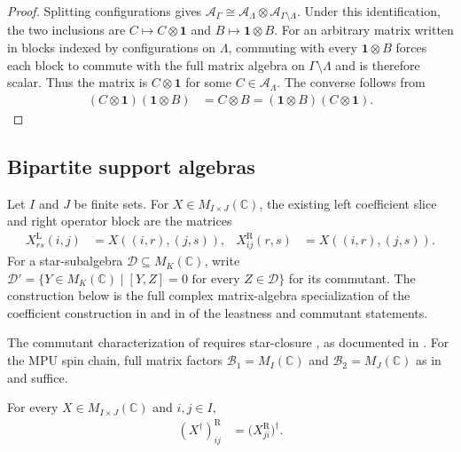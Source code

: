 \begin{proof}\leanok
    Splitting configurations gives
    $\mathcal A_\Gamma\cong
        \mathcal A_\Lambda\otimes\mathcal A_{\Gamma\setminus\Lambda}$. Under this
    identification, the two inclusions are $C\mapsto C\otimes\mathbf 1$ and
    $B\mapsto\mathbf 1\otimes B$. For an arbitrary matrix written in blocks indexed
    by configurations on $\Lambda$, commuting with every
    $\mathbf 1\otimes B$ forces each block to commute with the full matrix algebra on
    $\Gamma\setminus\Lambda$ and is therefore scalar. Thus the matrix is
    $C\otimes\mathbf 1$ for some $C\in\mathcal A_\Lambda$. The converse follows
    from
    \begin{align}
        (C\otimes\mathbf 1)(\mathbf 1\otimes B)
         & =C\otimes B
        =(\mathbf 1\otimes B)(C\otimes\mathbf 1).
    \end{align}
\end{proof}

\subsection{Bipartite support algebras}

Let $I$ and $J$ be finite sets.  For
$X\in M_{I\times J}(\mathbb C)$, the existing left coefficient slice and
right operator block are the matrices
\begin{align}
    X^{\mathrm L}_{rs}(i,j) & =X((i,r),(j,s)), &
    X^{\mathrm R}_{ij}(r,s) & =X((i,r),(j,s)).
\end{align}
For a star-subalgebra $\mathcal D\subseteq M_K(\mathbb C)$, write
$\mathcal D'=\{Y\in M_K(\mathbb C)\mid [Y,Z]=0\text{ for every }Z\in\mathcal D\}$
for its commutant.  The construction below is the full complex matrix-algebra
specialization of the coefficient construction in
\cite[Section~4.3]{SchumacherWerner2004QCA} and in \cite[Lemma~7]{Gross2012IndexTheory} of the leastness and commutant
statements.

The commutant characterization of \cite[Lemma~7]{Gross2012IndexTheory} requires
star-closure \cite[lines~1161--1171]{SchumacherWerner2004QCA}, as documented
in \cite{gap:gnvw12_support_algebra_star_closure}. For the MPU spin chain, full
matrix factors $\mathcal B_1=M_I(\mathbb C)$ and $\mathcal B_2=M_J(\mathbb C)$
as in \cite[lines~2320--2334]{Cirac2017MPU} and \cite{gap:gnvw12_support_algebra_full_matrix_scope}
suffice.

\begin{lemma}
    \label{thm:qca_operator_block_adjoint}
    \leanok
    For every $X\in M_{I\times J}(\mathbb C)$ and $i,j\in I$,
    \begin{align}
        (X^\dagger)^{\mathrm R}_{ij}
         & =\bigl(X^{\mathrm R}_{ji}\bigr)^\dagger.
    \end{align}
\end{lemma}

